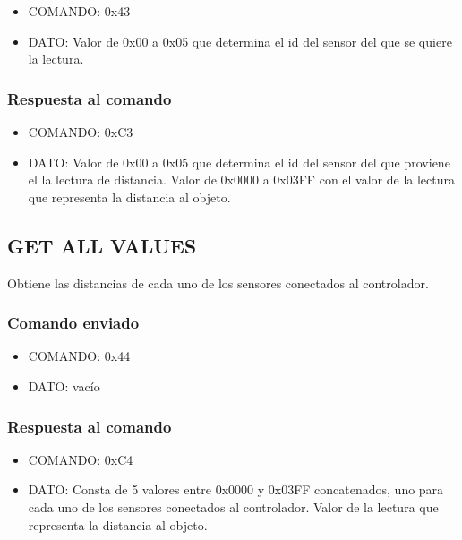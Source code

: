 \documentclass[a4paper,10pt]{article}
\begin{document}
\begin{itemize}
	\item{COMANDO:} 0x43
	\item{DATO:} Valor de 0x00 a 0x05 que determina el id del sensor del que se quiere la lectura.
\end{itemize}

\subsubsection*{Respuesta al comando}

\begin{itemize}
	\item{COMANDO:} 0xC3
	\item{DATO:} Valor de 0x00 a 0x05 que determina el id del sensor del que proviene el la lectura de distancia.
	Valor de 0x0000 a 0x03FF con el valor de la lectura que representa la distancia al objeto.
\end{itemize}

\subsection{GET ALL VALUES}
\label{get_all_values_fs}

Obtiene las distancias de cada uno de los sensores conectados al controlador.

\subsubsection*{Comando enviado}

\begin{itemize}
	\item{COMANDO:} 0x44
	\item{DATO:} vac\'io
\end{itemize}

\subsubsection*{Respuesta al comando}

\begin{itemize}
	\item{COMANDO:} 0xC4
	\item{DATO:} Consta de 5 valores entre 0x0000 y 0x03FF concatenados, uno para cada uno de los sensores conectados al controlador.
	Valor de la lectura que representa la distancia al objeto.
\end{itemize}
\end{document}
